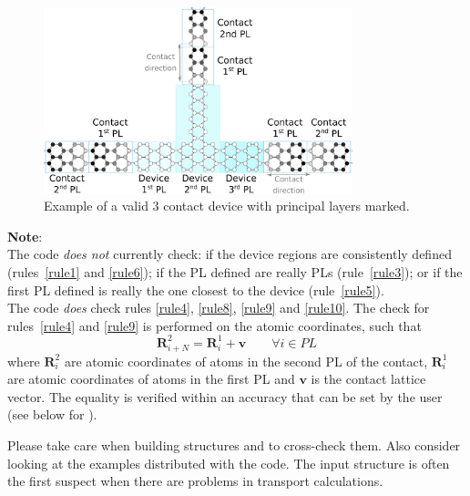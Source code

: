 \begin{figure}[!h]
  \begin{center}
    \includegraphics[width=0.8\textwidth]{Fig_device.pdf}
  \end{center}
  \caption{ \label{fig:device} Example of a valid 3 contact device with
    principal layers marked.}
\end{figure}

{\bf Note}:\\ The code {\em does not} currently check: if the device regions are
consistently defined (rules~\ref{rule1} and \ref{rule6}); if the PL defined are
really PLs (rule~\ref{rule3}); or if the first PL defined is really the one
closest to the device (rule~\ref{rule5}).\\ The code {\em does} check rules
\ref{rule4}, \ref{rule8}, \ref{rule9} and \ref{rule10}. The check for
rules~\ref{rule4} and \ref{rule9} is performed on the atomic coordinates, such
that
\begin{equation}
 \mathbf{R}^2_{i+N} = \mathbf{R}^1_i + \mathbf{v}\qquad\forall i \in PL
\end{equation}
where $\mathbf{R}^2_i$ are atomic coordinates of atoms in the second PL of the
contact, $\mathbf{R}^1_i$ are atomic coordinates of atoms in the first PL and
$\mathbf{v}$ is the contact lattice vector. The equality is verified within an
accuracy that can be set by the user (see below for ).

Please take care when building structures and to cross-check them. Also consider
looking at the examples distributed with the code. The input structure is often
the first suspect when there are problems in transport calculations.



